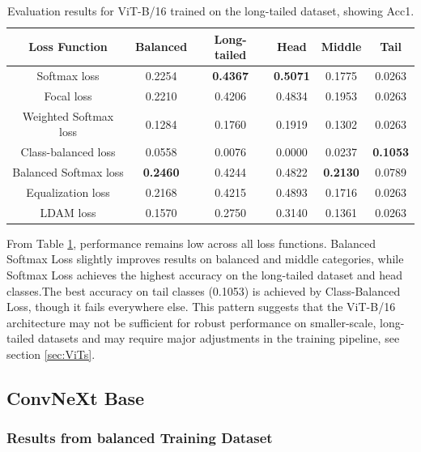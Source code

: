 \begin{table}[h!]
    \centering
    \caption{Evaluation results for ViT-B/16 trained on the long-tailed dataset, showing Acc1.}
    \begin{tabular}{cccccc}
        \toprule
        Loss Function & Balanced & Long-tailed & Head & Middle & Tail \\ 
        \midrule
        Softmax loss   & 0.2254 & \textbf{0.4367} & \textbf{0.5071} & 0.1775 & 0.0263 \\
        Focal loss   & 0.2210 & 0.4206 & 0.4834 & 0.1953 & 0.0263 \\
        Weighted Softmax loss   & 0.1284 & 0.1760 & 0.1919 & 0.1302 & 0.0263 \\
        Class-balanced loss   & 0.0558 & 0.0076 & 0.0000 & 0.0237 & \textbf{0.1053} \\
        Balanced Softmax loss   & \textbf{0.2460} & 0.4244 & 0.4822 &  \textbf{0.2130} & 0.0789 \\
        Equalization loss   & 0.2168 & 0.4215 & 0.4893 & 0.1716 & 0.0263 \\
        LDAM loss   & 0.1570 & 0.2750 & 0.3140 & 0.1361 & 0.0263 \\
        \bottomrule
    \end{tabular}
    \label{tab:vit_lt_acc1}
\end{table}

From Table \ref{tab:vit_lt_acc1}, performance remains low across all loss functions. Balanced Softmax Loss slightly improves results on balanced and middle categories, while Softmax Loss achieves the highest accuracy on the long-tailed dataset and head classes.The best accuracy on tail classes (0.1053) is achieved by Class-Balanced Loss, though it fails everywhere else. This pattern suggests that the ViT-B/16 architecture may not be sufficient for robust performance on smaller-scale, long-tailed datasets and may require major adjustments in the training pipeline, see section \ref{sec:ViTs}. 

\subsection{ConvNeXt Base}

\subsubsection{Results from balanced Training Dataset}

